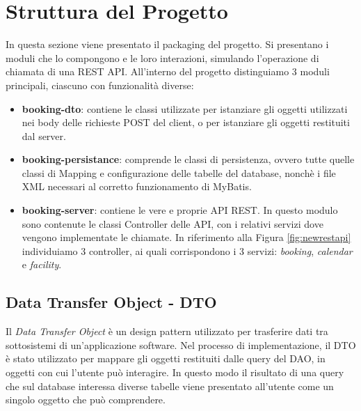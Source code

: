 \section{Struttura del Progetto}
In questa sezione viene presentato il packaging del progetto. Si presentano i moduli che lo compongono e le loro interazioni, simulando l'operazione di chiamata di una REST API. All'interno del progetto distinguiamo 3 moduli principali, ciascuno con funzionalità diverse:
\begin{itemize}
    \item \textbf{booking-dto}: contiene le classi utilizzate per istanziare gli oggetti utilizzati nei body delle richieste POST del client, o per istanziare gli oggetti restituiti dal server.
    \item \textbf{booking-persistance}: comprende le classi di persistenza, ovvero tutte quelle classi di Mapping e configurazione delle tabelle del database, nonchè i file XML necessari al corretto funzionamento di MyBatis.
    \item \textbf{booking-server}: contiene le vere e proprie API REST. In questo modulo sono contenute le classi Controller delle API, con i relativi servizi dove vengono implementate le chiamate. In riferimento alla Figura \ref{fig:newrestapi} individuiamo 3 controller, ai quali corrispondono i 3 servizi: \emph{booking}, \emph{calendar} e \emph{facility}.
\end{itemize}

\subsection{Data Transfer Object - DTO}
Il \emph{Data Transfer Object} è un design pattern utilizzato per trasferire dati tra sottosistemi di un'applicazione software. Nel processo di implementazione, il DTO è stato utilizzato per mappare gli oggetti restituiti dalle query del DAO, in oggetti con cui l'utente può interagire. In questo modo il risultato di una query che sul database interessa diverse tabelle viene presentato all'utente come un singolo oggetto che può comprendere.

